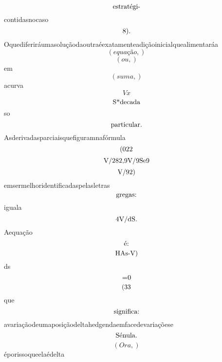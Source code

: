 \documentclass{article}
\begin{document}
\begin{equation}
$estratégi-$
\end{equation}contidasnocaso\begin{equation}
$8).$
\end{equation}Oquediferiráumasoluçãodaoutraéexatamenteadiçãoinicialquealimentaráa\begin{equation}
\left( equação,\right)
\end{equation}\begin{equation}
\left( ou,\right)
\end{equation}em\begin{equation}
\left( suma,\right)
\end{equation}acurva\begin{equation}
V x
\end{equation}\begin{equation}
$S*decada$
\end{equation}so\begin{equation}
$particular.$
\end{equation}Asderivadasparciaisquefiguramnafórmula\begin{equation}
$(022$
\end{equation}\begin{equation}
$V/282,9V/9Se9$
\end{equation}\begin{equation}
$V/92)$
\end{equation}emsermelhoridentificadaspelasletras\begin{equation}
$gregas:$
\end{equation}iguala\begin{equation}
$4V/dS.$
\end{equation}Aequação\begin{equation}
$é:$
\end{equation}\begin{equation}
$HAs-V)$
\end{equation}ds\begin{equation}
$=0$
\end{equation}\begin{equation}
$(33$
\end{equation}que\begin{equation}
$significa:$
\end{equation}avariaçãodeumaposiçãodeltahedgendaemfacedevariaçõese\begin{equation}
$Sénula.$
\end{equation}\begin{equation}
\left( Ora,\right)
\end{equation}éporissoqueelaédelta\begin{equation}

\end{equation}
\end{document}

